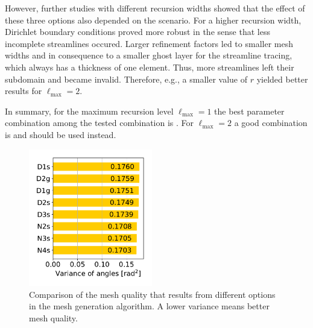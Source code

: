 However, further studies with different recursion widths showed that the effect of these three options also depended on the scenario. For a higher recursion width, Dirichlet boundary conditions proved more robust in the sense that less incomplete streamlines occured. Larger refinement factors led to smaller mesh widths and in consequence to a smaller ghost layer for the streamline tracing, which always has a thickness of one element. Thus, more streamlines left their subdomain and became invalid. Therefore, e.g., a smaller value of $r$ yielded better results for $\ell_\text{max}=2$.

In summary, for the maximum recursion level $\ell_\text{max}=1$ the best parameter combination among the tested combination is . For $\ell_\text{max}=2$ a good combination is  and should be used instead.

\begin{figure}%
  \centering%
  \includegraphics[height=6cm]{images/parallel_fiber_estimation/mesh_quality_options.pdf}%
  \caption{Comparison of the mesh quality that results from different options in the mesh generation algorithm. A lower variance means better mesh quality.}%
  \label{fig:3mesh_quality}%
\end{figure}%

